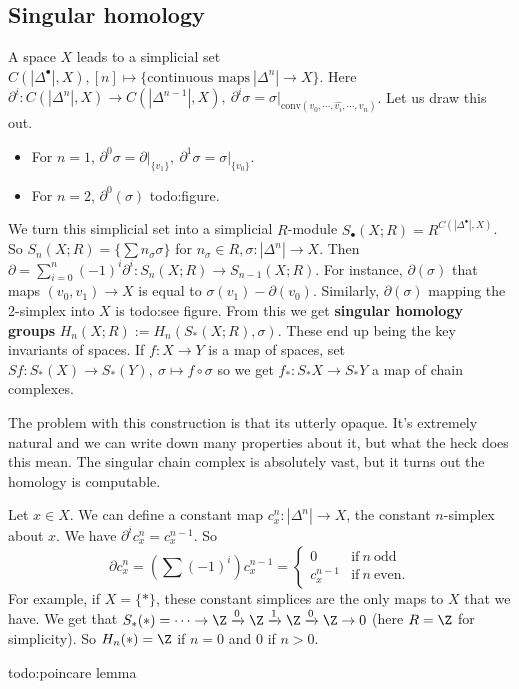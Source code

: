    \subsection{Singular homology}
   A space $X$ leads to a simplicial set $C(|\Delta ^{\bullet}|,X), [n] \mapsto  \{\text{continuous maps} \ |\Delta ^n | \to X\} $. Here $\partial ^i  \colon C(|\Delta ^n|,X)  \to C(|\Delta ^{n-1}|,X),\ \partial ^i \sigma= \left. \sigma \right| _{\mathrm{conv}(v_0, \cdots , \hat{v_i }, \cdots ,v_n )}$. Let us draw this out.
       \begin{itemize}
       \setlength\itemsep{-.2em}
           \item For $n=1$, $\partial ^0 \sigma=\left. \partial \right| _{\{v_1\} }     ,\ \partial ^1 \sigma= \left. \sigma \right| _{\{v_0\} } $.
                   \item For $n=2$, $\partial ^0(\sigma)$ {\color{red}todo:figure}. 
               \end{itemize}We turn this simplicial set into a simplicial $R$-module $S_{\bullet}(X;R)=R^{C(|\Delta ^{\bullet}|,X)}$. So $S_n (X;R)= \{\sum n_{\sigma}\sigma\} $ for $n_{\sigma}\in R, \sigma \colon |\Delta ^n | \to X$. Then $\partial = \sum_{i=0}^{n} (-1)^i  \partial ^i  \colon S_n (X;R) \to S_{n-1}(X;R)$. For instance, $\partial (\sigma)$ that maps $(v_0,v_1) \to X$ is equal to $\sigma(v_1)-\partial (v_0)$. Similarly, $\partial (\sigma )$ mapping the 2-simplex into $X$ is {\color{red}todo:see figure}. From this we get \textbf{singular homology groups} $H_n (X;R):=H_n (S_*(X;R),\sigma)$. These end up being the key invariants of spaces. 
               If $f \colon X \to Y$ is a map of spaces, set $Sf \colon S_*(X) \to S_*(Y),\ \sigma\mapsto f \circ \sigma$ so we get $f_* \colon S_*X \to S_*Y$ a map of chain complexes.

               The problem with this construction is that its utterly opaque. It's extremely natural and we can write down many properties about it, but what the heck does this mean. The singular chain complex is absolutely vast, but it turns out the homology is computable.

\begin{example}
Let $x \in X$. We can define a constant map $c_x^n  \colon |\Delta ^n | \to X$, the constant $n$-simplex about $x$. We have $\partial ^i  c^n _x= c^{n-1}_x$. So 
\[
    \partial c^n _x=\left( \sum (-1)^i  \right) c_x^{n-1}=
    \begin{cases}
        0 &\text{if}\ n \ \text{odd}\\
        c_x^{n-1}&\text{if} \ n \ \text{even}.
    \end{cases}
\] For example, if $X=\{*\} $, these constant simplices are the only maps to $X$ that we have. We get that $S_*(*)= \cdots  \to \Z \xrightarrow 0 \Z \xrightarrow 1 \Z \xrightarrow 0 \Z \to 0 $ (here $R=\Z$ for simplicity). So $H_n (*)= \Z$ if $n=0$ and 0 if $n>0$.
\end{example}
{\color{red}todo:poincare lemma} 
